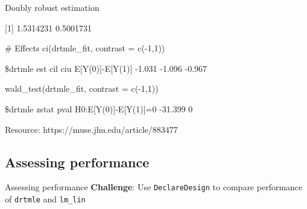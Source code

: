\documentclass[
  11pt,
  ignorenonframetext,
]{beamer}
\newenvironment{Shaded}{\begin{snugshade}}{\end{snugshade}}
\newcommand{\AttributeTok}[1]{\textcolor[rgb]{0.40,0.45,0.13}{#1}}
\newcommand{\CommentTok}[1]{\textcolor[rgb]{0.37,0.37,0.37}{#1}}
\newcommand{\DecValTok}[1]{\textcolor[rgb]{0.68,0.00,0.00}{#1}}
\newcommand{\FunctionTok}[1]{\textcolor[rgb]{0.28,0.35,0.67}{#1}}
\newcommand{\NormalTok}[1]{\textcolor[rgb]{0.00,0.23,0.31}{#1}}
\newcommand{\SpecialCharTok}[1]{\textcolor[rgb]{0.37,0.37,0.37}{#1}}
\begin{document}
\begin{frame}[fragile]{Doubly robust estimation}
\protect\hypertarget{doubly-robust-estimation-5}{}
\begin{Shaded}
\end{Shaded}

{[}1{]} 1.5314231 0.5001731

\begin{Shaded}
\begin{Highlighting}[]
\CommentTok{\# Effects}
\FunctionTok{ci}\NormalTok{(drtmle\_fit, }\AttributeTok{contrast =} \FunctionTok{c}\NormalTok{(}\SpecialCharTok{{-}}\DecValTok{1}\NormalTok{,}\DecValTok{1}\NormalTok{))}
\end{Highlighting}
\end{Shaded}

\$drtmle est cil ciu E{[}Y(0){]}-E{[}Y(1){]} -1.031 -1.096 -0.967

\begin{Shaded}
\begin{Highlighting}[]
\FunctionTok{wald\_test}\NormalTok{(drtmle\_fit, }\AttributeTok{contrast =} \FunctionTok{c}\NormalTok{(}\SpecialCharTok{{-}}\DecValTok{1}\NormalTok{,}\DecValTok{1}\NormalTok{))}
\end{Highlighting}
\end{Shaded}

\$drtmle zstat pval H0:E{[}Y(0){]}-E{[}Y(1){]}=0 -31.399 0

Resource: https://muse.jhu.edu/article/883477
\end{frame}

\hypertarget{assessing-performance}{%
\subsection{Assessing performance}\label{assessing-performance}}

\begin{frame}[fragile]{Assessing performance}
\textbf{Challenge}: Use \texttt{DeclareDesign} to compare performance of
\texttt{drtmle} and \texttt{lm\_lin}
\end{frame}
\end{document}
